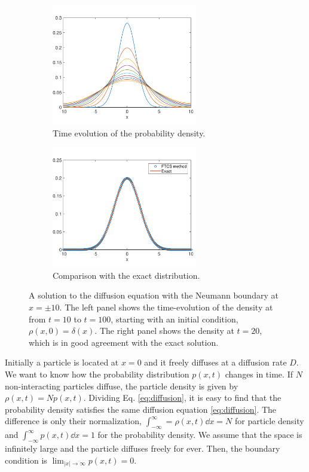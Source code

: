 \begin{example}

\begin{figure}
	\centering
	\begin{subfigure}{0.45\textwidth}
		\centering
		\includegraphics[width=2.5in]{13.pde1/free-diffusion-evolution.pdf}
		\caption{Time evolution of the probability density.}
	\end{subfigure}
	\begin{subfigure}{0.45\textwidth}
		\centering
		\includegraphics[width=2.5in]{13.pde1/free-diffusion.pdf}
		\caption{Comparison with the exact distribution.}
	\end{subfigure}
	\caption{A solution to the diffusion equation with the Neumann boundary  at $x=\pm 10$.  The left panel shows the time-evolution of the density at from $t=10$ to $t=100$, starting with an initial condition, $\rho(x,0)=\delta(x)$.  The right panel shows the density at $t=20$, which is in good agreement with the exact solution.}
	\label{fig:diffusion} 
\end{figure}

Initially a particle is located at $x=0$ and it freely diffuses at a diffusion rate $D$.  We want to know how the probability distribution $p(x,t)$ changes in time.  If $N$ non-interacting particles diffuse, the particle density is given by $\rho(x,t)=N p(x,t)$. Dividing Eq. \eqref{eq:diffusion}, it is easy to find that the probability density satisfies the same diffusion equation \eqref{eq:diffusion}.  The difference is only their normalization, $\displaystyle\int_{-\infty}^{\infty} = \rho(x,t) \dd{x} = N$ for particle density and $\displaystyle\int_{-\infty}^{\infty} p(x,t) \dd{x} = 1$ for the probability density.  We assume that the space is infinitely large and the particle diffuses freely for ever.  Then, the boundary condition is $\lim_{|x| \rightarrow \infty} p(x,t)=0$.


\end{example}
